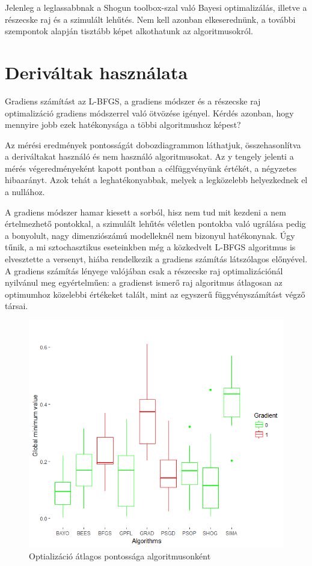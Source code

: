 Jelenleg a leglassabbnak a Shogun toolbox-szal való Bayesi optimalizálás, illetve a részecske raj és a szimulált lehűtés. Nem kell azonban elkeserednünk, a további szempontok alapján tisztább képet alkothatunk az algoritmusokról.
\section{Deriváltak használata}
\label{sec:derivaltak}
Gradiens számítást az L-BFGS, a gradiens módszer és a részecske raj optimalizáció gradiens módszerrel való ötvözése igényel. Kérdés azonban, hogy mennyire jobb ezek hatékonysága a többi algoritmushoz képest?

Az mérési eredmények pontosságát  dobozdiagrammon láthatjuk, összehasonlítva a deriváltakat használó és nem használó algoritmusokat. Az y tengely jelenti a mérés végeredményeként kapott pontban a célfüggvényünk értékét, a négyzetes hibaarányt. Azok tehát a leghatékonyabbak, melyek a legközelebb helyezkednek el a nullához.

A gradiens módszer hamar kiesett a sorból, hisz nem tud mit kezdeni a nem értelmezhető pontokkal, a szimulált lehűtés véletlen pontokba való ugrálása pedig a bonyolult, nagy dimenziószámú modelleknél nem bizonyul hatékonynak. Úgy tűnik, a mi sztochasztikus eseteinkben még a közkedvelt L-BFGS algoritmus is elvesztette a versenyt, hiába rendelkezik a gradiens számítás látszólagos előnyével. A gradiens számítás lényege valójában csak a részecske raj optimalizációnál nyilvánul meg egyértelműen: a gradienst ismerő raj algoritmus átlagosan az optimumhoz közelebbi értékeket talált, mint az egyszerű függvényszámítást végző társai.


\begin{figure}
	\centering
	\includegraphics[width=140mm, keepaspectratio]{figures/gradiens_pontossag_boxplot.png}
	\caption{Optializáció átlagos pontossága algoritmusonként}
	\label{fig:derivaltak}
\end{figure}

